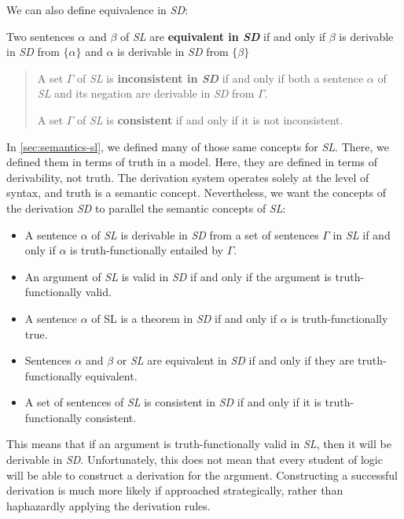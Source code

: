 \documentclass[../logic-text.tex]{subfiles}
\begin{document}
We can also define equivalence in \emph{SD}:

Two sentences \(\alpha\) and \(\beta\) of \emph{SL} are \textbf{equivalent in \emph{SD}} if and only if \(\beta\) is derivable in \emph{SD} from \(\{\alpha\}\) and \(\alpha\) is derivable in \emph{SD} from \(\{\beta\}\)

\begin{quote}
  A set \(\Gamma\) of \emph{SL} is \textbf{inconsistent in \emph{SD}} if and only if both a sentence \(\alpha\) of \emph{SL} and its negation are derivable in \emph{SD} from \(\Gamma\).

  A set \(\Gamma\) of \emph{SL} is \textbf{consistent} if and only if it is not inconsistent.
\end{quote}

In \autoref{sec:semantics-sl}, we defined many of those same concepts for \emph{SL}. There, we defined them in terms of truth in a model. Here, they are defined in terms of derivability, not truth. The derivation system operates solely at the level of syntax, and truth is a semantic concept. Nevertheless, we want the concepts of the derivation \emph{SD} to parallel the semantic concepts of \emph{SL}:

\begin{itemize}
  \item A sentence \(\alpha\) of \emph{SL} is derivable in \emph{SD} from a set of sentences  \(\Gamma\) in \emph{SL}  if and only if \(\alpha\) is truth-functionally entailed by \(\Gamma\).
  \item An argument of \emph{SL} is valid in \emph{SD} if and only if the argument is truth-functionally valid.
  \item A sentence \(\alpha\) of SL is a theorem in \emph{SD} if and only if \(\alpha\) is truth-functionally true.
  \item Sentences \(\alpha\) and \(\beta\) or \emph{SL} are equivalent in \emph{SD} if and only if they are truth-functionally equivalent.
  \item A set of sentences of \emph{SL} is consistent in \emph{SD} if and only if it is truth-functionally consistent.
\end{itemize}

This means that if an argument is truth-functionally valid in \emph{SL}, then it will be derivable in \emph{SD}. Unfortunately, this does not mean that every student of logic will be able to construct a derivation for the argument. Constructing a successful derivation is much more likely if approached strategically, rather than haphazardly applying the derivation rules.
\end{document}
